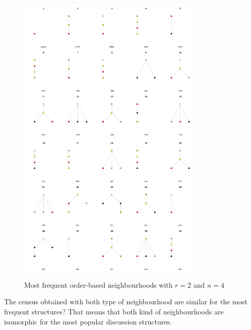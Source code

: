 \documentclass[conference]{IEEEtran}
\begin{document}
\begin{figure}
	\centering
	\includegraphics[width=0.8\textwidth]{census_orderbased_1}
	\includegraphics[width=0.8\textwidth]{census_orderbased_2}
	\caption{Most frequent order-based neighbourhoods with $r=2$ and $n=4$}
	\label{fig:census_orderbased}
\end{figure}

The census obtained with both type of neighbourhood are similar for the most frequent structures? That means that both kind of neighbourhoods are isomorphic for the most popular discussion structures.

\end{document}
